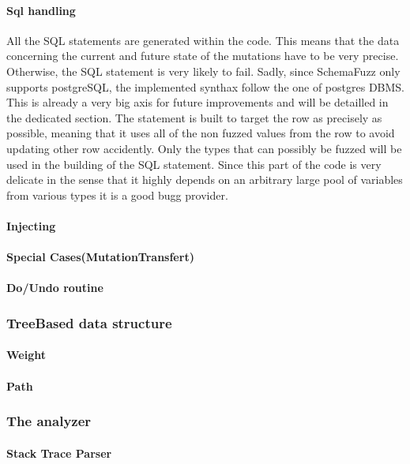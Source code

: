 \documentclass{article}
\begin{document}
				\paragraph{Sql handling}
All the SQL statements are generated within the code. This means that the data concerning the current and future state of the mutations have to be very precise. Otherwise, the SQL statement is very likely to fail. Sadly, since SchemaFuzz only supports postgreSQL, the implemented synthax follow the one of postgres
DBMS. This is already a very big axis for future improvements and will be detailled in the dedicated section.
The statement is built to target the row as precisely as possible, meaning that it uses all of the non fuzzed values from the row to avoid updating other row accidently. Only the types that can possibly be fuzzed will be used in the building of the SQL statement. Since this part of the code is very delicate in the sense that it highly depends on an arbitrary large pool of variables from various types it is a good bugg provider. 
				
				\paragraph{Injecting}
				\paragraph{Special Cases(MutationTransfert)}
				\paragraph{Do/Undo routine}
			\subsubsection{TreeBased data structure}
				\paragraph{Weight}
				\paragraph{Path}
			\subsubsection{The analyzer}
				\paragraph{Stack Trace Parser}
\end{document}
